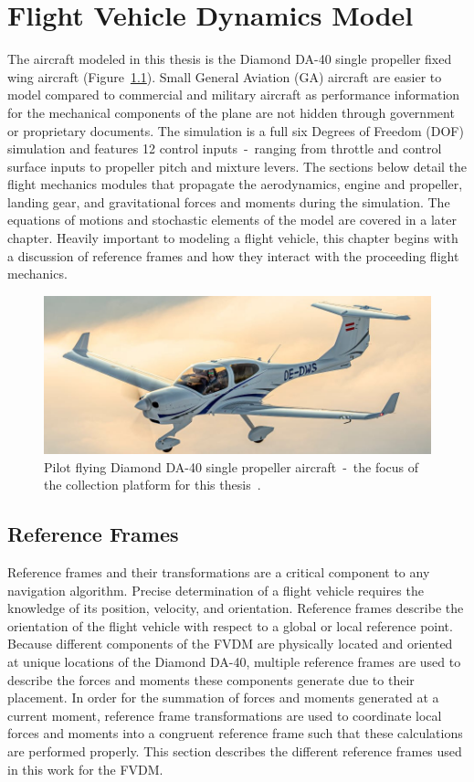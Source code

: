 \chapter{Flight Vehicle Dynamics Model}
The aircraft modeled in this thesis is the Diamond DA-40 single propeller fixed wing aircraft (Figure~\ref{fig:DA40}). Small General Aviation (GA) aircraft are easier to model compared to commercial and military aircraft as performance information for the mechanical components of the plane are not hidden through government or proprietary documents. The simulation is a full six Degrees of Freedom (DOF) simulation and features 12 control inputs~-~ranging from throttle and control surface inputs to propeller pitch and mixture levers. The sections below detail the flight mechanics modules that propagate the aerodynamics, engine and propeller, landing gear, and gravitational forces and moments during the simulation. The equations of motions and stochastic elements of the model are covered in a later chapter. Heavily important to modeling a flight vehicle, this chapter begins with a discussion of reference frames and how they interact with the proceeding flight mechanics.

\begin{figure}[!ht]\label{fig:DA40}
    \centering
    \includegraphics[width=.85\linewidth]{Figures/DA40.jpg}
    \caption{Pilot flying Diamond DA-40 single propeller aircraft~-~the focus of the collection platform for this thesis~\cite{DiamondAircraftDA40}.}
\end{figure}

\section{Reference Frames}
Reference frames and their transformations are a critical component to any navigation algorithm. Precise determination of a flight vehicle requires the knowledge of its position, velocity, and orientation. Reference frames describe the orientation of the flight vehicle with respect to a global or local reference point. Because different components of the FVDM are physically located and oriented at unique locations of the Diamond DA-40, multiple reference frames are used to describe the forces and moments these components generate due to their placement. In order for the summation of forces and moments generated at a current moment, reference frame transformations are used to coordinate local forces and moments into a congruent reference frame such that these calculations are performed properly. This section describes the different reference frames used in this work for the FVDM\@.
